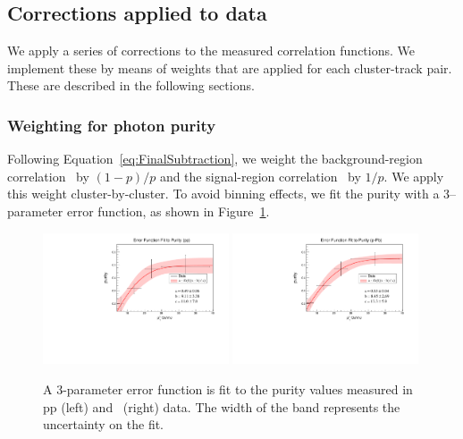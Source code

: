 \subsection{Corrections applied to data}
We apply a series of corrections to the measured correlation functions. We implement these by means of weights that are applied for each cluster-track pair. These are described in the following sections. 


\subsubsection{Weighting for photon purity}
Following Equation~\ref{eq:FinalSubtraction}, we weight the background-region correlation \CBR~by $(1-p)/p$ and the signal-region correlation \CSR~by $1/p$. We apply this weight cluster-by-cluster. To avoid binning effects, we fit the purity with a 3--parameter error function, as shown in Figure~\ref{fig:ErrFunc_Purity}.

\begin{figure}[h]
    \centering
    \includegraphics[width=0.49\textwidth]{G-H_New/pp_Err_Function_Purity.pdf}
    \includegraphics[width=0.49\textwidth]{G-H_New/p-Pb_Err_Function_Purity.pdf}
    \caption{A 3-parameter error function is fit to the purity values measured in pp (left) and \pPb~(right) data. The width of the band represents the uncertainty on the fit.}
    \label{fig:ErrFunc_Purity}
\end{figure}


